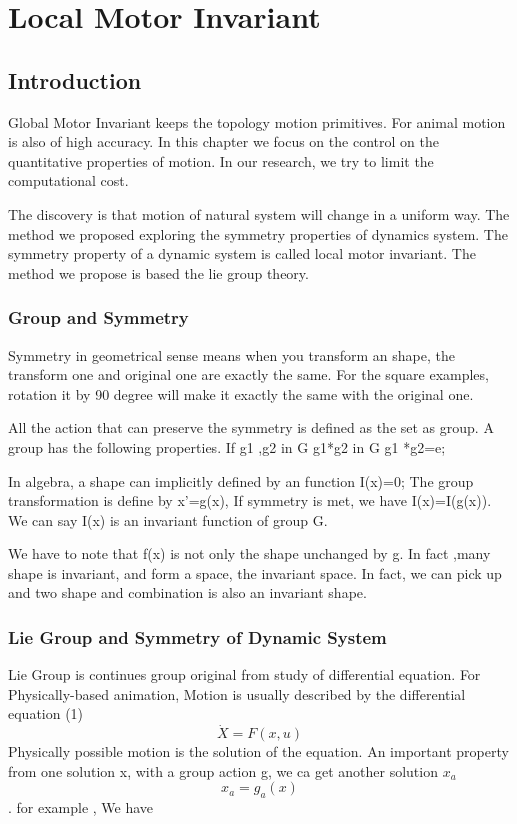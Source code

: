 \chapter{Local Motor Invariant}
\section{Introduction}
Global Motor Invariant keeps the topology motion primitives.
For animal motion is also of high accuracy.
In this chapter we focus on the control on the quantitative properties of motion.
In our research, we try to limit the computational cost.


The discovery is that motion of natural system will change in a uniform way.
The method we proposed exploring the symmetry properties of dynamics system.
The symmetry property of a dynamic system is called local motor invariant.
The method we propose is based the lie group theory.

\subsection{Group and Symmetry}
Symmetry in geometrical sense means when you transform an shape, the transform one and original one are exactly the same.
For the square examples, rotation it by 90 degree will make it exactly the same with the original one.



All the action that can preserve the symmetry is defined as the set as group.
A group has the following properties.
If g1 ,g2 in G
g1*g2 in G
g1 *g2=e;

In algebra, a shape can implicitly defined by an function I(x)=0;
The group transformation is define by x’=g(x),
If symmetry is met, we have I(x)=I(g(x)).
We can say I(x) is an invariant function of group G.

We have to note that f(x) is not only the shape unchanged by g.
In fact ,many shape is invariant, and form a space, the invariant space.
In fact, we can pick up and two shape and combination is also an invariant shape. 








\subsection{Lie Group and Symmetry of Dynamic System}
Lie Group is continues group original from study of differential equation.
For Physically-based animation,
Motion is usually described by the differential equation (1)
\begin{equation}
	\dot{X}=F(x,u)
\end{equation}
Physically possible motion is the solution of the equation.
An important property from one solution x, with a group action g, we ca get another solution $x_a$
 	\[
x_a=g_a(x)
\]
.
for example
, 
We have 

